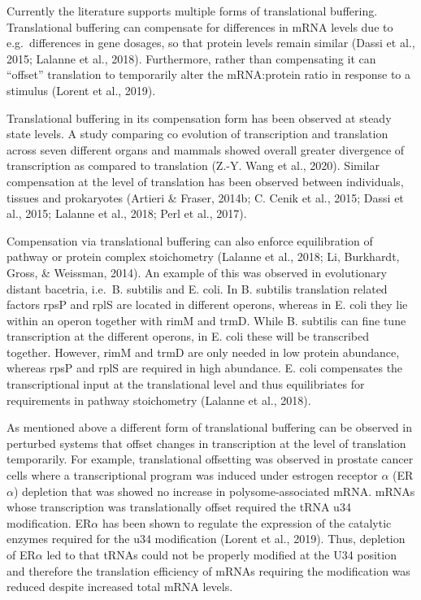 \documentclass[12pt,openany]{book}
\begin{document}
Currently the literature supports multiple forms of translational
buffering. Translational buffering can compensate for differences in
mRNA levels due to e.g.~differences in gene dosages, so that protein
levels remain similar (Dassi et al., 2015; Lalanne et al., 2018).
Furthermore, rather than compensating it can ``offset'' translation to
temporarily alter the mRNA:protein ratio in response to a stimulus
(Lorent et al., 2019).

Translational buffering in its compensation form has been observed at
steady state levels. A study comparing co evolution of transcription and
translation across seven different organs and mammals showed overall
greater divergence of transcription as compared to translation (Z.-Y.
Wang et al., 2020). Similar compensation at the level of translation has
been observed between individuals, tissues and prokaryotes (Artieri \&
Fraser, 2014b; C. Cenik et al., 2015; Dassi et al., 2015; Lalanne et
al., 2018; Perl et al., 2017).

Compensation via translational buffering can also enforce equilibration
of pathway or protein complex stoichometry (Lalanne et al., 2018; Li,
Burkhardt, Gross, \& Weissman, 2014). An example of this was observed in
evolutionary distant bacetria, i.e.~B. subtilis and E. coli. In B.
subtilis translation related factors rpsP and rplS are located in
different operons, whereas in E. coli they lie within an operon together
with rimM and trmD. While B. subtilis can fine tune transcription at the
different operons, in E. coli these will be transcribed together.
However, rimM and trmD are only needed in low protein abundance, whereas
rpsP and rplS are required in high abundance. E. coli compensates the
transcriptional input at the translational level and thus equilibriates
for requirements in pathway stoichometry (Lalanne et al., 2018).

As mentioned above a different form of translational buffering can be
observed in perturbed systems that offset changes in transcription at
the level of translation temporarily. For example, translational
offsetting was observed in prostate cancer cells where a transcriptional
program was induced under estrogen receptor \(\alpha\) (ER\(\alpha\))
depletion that was showed no increase in polysome-associated mRNA. mRNAs
whose transcription was translationally offset required the tRNA u34
modification. ER\(\alpha\) has been shown to regulate the expression of
the catalytic enzymes required for the u34 modification (Lorent et al.,
2019). Thus, depletion of ER\(\alpha\) led to that tRNAs could not be
properly modified at the U34 position and therefore the translation
efficiency of mRNAs requiring the modification was reduced despite
increased total mRNA levels. \newline
\end{document}

